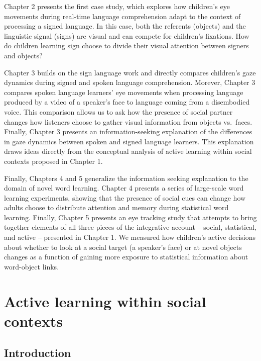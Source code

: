 \documentclass[oneside]{report}
\begin{document}
Chapter 2 presents the first case study, which explores how children's
eye movements during real-time language comprehension adapt to the
context of processing a signed language. In this case, both the
referents (objects) and the linguistic signal (signs) are visual and can
compete for children's fixations. How do children learning sign choose
to divide their visual attention between signers and objects?

Chapter 3 builds on the sign language work and directly compares
children's gaze dynamics during signed and spoken language
comprehension. Morever, Chapter 3 compares spoken language learners' eye
movements when processing language produced by a video of a speaker's
face to language coming from a disembodied voice. This comparison allows
us to ask how the presence of social partner changes how listeners
choose to gather visual information from objects vs.~faces. Finally,
Chapter 3 presents an information-seeking explanation of the differences
in gaze dynamics between spoken and signed language learners. This
explanation draws ideas directly from the conceptual analysis of active
learning within social contexts proposed in Chapter 1.

Finally, Chapters 4 and 5 generalize the information seeking explanation
to the domain of novel word learning. Chapter 4 presents a series of
large-scale word learning experiments, showing that the presence of
social cues can change how adults choose to distribute attention and
memory during statistical word learning. Finally, Chapter 5 presents an
eye tracking study that attempts to bring together elements of all three
pieces of the integrative account -- social, statistical, and active --
presented in Chapter 1. We measured how children's active decisions
about whether to look at a social target (a speaker's face) or at novel
objects changes as a function of gaining more exposure to statistical
information about word-object links.

\hypertarget{active-learning-within-social-contexts}{%
\chapter{Active learning within social
contexts}\label{active-learning-within-social-contexts}}

\hypertarget{introduction}{%
\section{Introduction}\label{introduction}}
\end{document}
